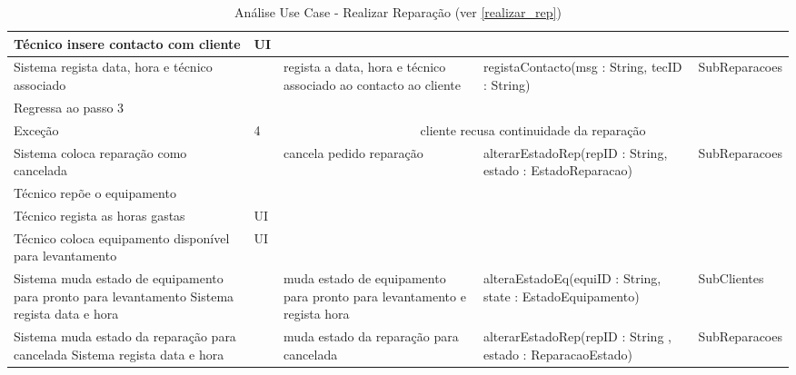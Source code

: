 \documentclass[../relatorio.tex]{subfiles}
\begin{document}
\begin{landscape}
\begin{table}[!h]
\begin{tabular}{|p{5cm}|p{1cm}|p{4cm}|p{6cm}|p{3cm}|}
            Técnico insere contacto com cliente
                     & UI
                     & 
                     & 
                     & 
            \\
            \hline
            Sistema regista data, hora e técnico associado
                     & 
                     & regista a data, hora e técnico associado ao contacto ao cliente 
                     & registaContacto(msg : String, tecID : String)
                     & SubReparacoes
            \\
            \hline
            Regressa ao passo 3
                     & 
                     & 
                     & 
                     & 
            \\
            \hline
            \rowcolor{red!30}
            Exceção  & 4                                               &  \multicolumn{3}{c}{cliente recusa continuidade da reparação}\\
            \hline
            Sistema coloca reparação como cancelada
                     & 
                     & cancela pedido reparação
                     & alterarEstadoRep(repID : String, estado : EstadoReparacao)
                     & SubReparacoes
            \\
            \hline
            Técnico repõe o equipamento
                     & 
                     & 
                     & 
                     & 
            \\
            \hline
            \rowcolor{yellow}
            Técnico regista as horas gastas
                     & UI
                     & 
                     & 
                     & 
            \\
            \hline
            \rowcolor{yellow}
            Técnico coloca equipamento disponível para levantamento
                     & UI
                     & 
                     & 
                     & 
            \\
            \hline
            Sistema muda estado de equipamento para pronto para levantamento
            Sistema regista data e hora
                     & 
                     & muda estado de equipamento para pronto para levantamento e regista hora
                     & alteraEstadoEq(equiID : String, state : EstadoEquipamento)
                     & SubClientes
            \\
            \hline
            Sistema muda estado da reparação para cancelada
            Sistema regista data e hora
                     & 
                     & muda estado da reparação para cancelada
                     & alterarEstadoRep(repID : String , estado : ReparacaoEstado)
                     & SubReparacoes
            \\
            \hline
        \end{tabular}
        \caption{Análise Use Case - Realizar Reparação (ver \ref{realizar_rep})}
    \end{table}
\end{landscape}
\end{document}
